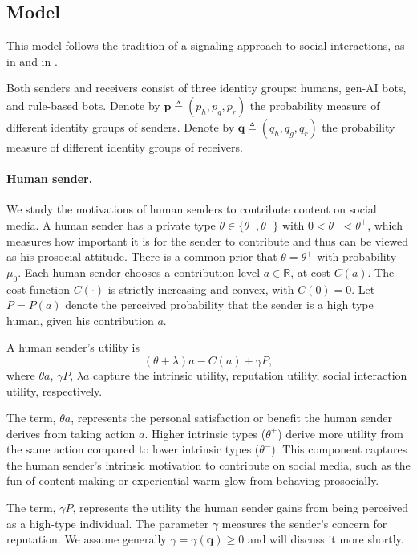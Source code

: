 \documentclass[english,12pt]{article}
\theoremstyle{plain}
\theoremstyle{plain}
\theoremstyle{definition}
\theoremstyle{definition}
\theoremstyle{assumption}
\theoremstyle{plain}
\theoremstyle{plain}
\theoremstyle{plain}
\theoremstyle{plain}
\theoremstyle{definition}%
\theoremstyle{plain}
\theoremstyle{plain}
\theoremstyle{plain}
\theoremstyle{plain}
\theoremstyle{plain}
\begin{document}
\subsection{Model}

This model follows the tradition of a signaling approach to social interactions, as in \cite{Bernheim:94} and in \cite{BenabouTirole:06}.

Both senders and receivers consist of three identity groups: humans, gen-AI bots, and rule-based bots. Denote by $\bm{p} \triangleq (p_h,p_g,p_r)$ the probability measure of different identity groups of senders. Denote by $\bm{q} \triangleq (q_h,q_g,q_r)$ the probability measure of different identity groups of receivers.

\paragraph{Human sender.} 

We study the motivations of human senders to contribute content on social media. A human sender has a private type $\theta\in \{\theta^-,\theta^+\}$ with $0<\theta^-<\theta^+$, which measures how important it is for the sender to contribute and thus can be viewed as his prosocial attitude. There is a common prior that $\theta=\theta^+$ with probability $\mu_0$. Each human sender chooses a contribution level $a\in \mathbb{R}$, at cost $C(a)$. The cost function $C(\cdot)$ is strictly increasing and convex, with $C(0)=0$. Let $P = P(a)$ denote the perceived probability that the sender is a high type human, given his contribution $a$.

A human sender's utility is
\begin{equation*}
    (\theta + \lambda )a - C(a) + \gamma P,
\end{equation*}
where $\theta a$, $\gamma P$, $\lambda a$ capture the intrinsic utility, reputation utility, social interaction utility, respectively.

The term, $\theta a$, represents the personal satisfaction or benefit the human sender derives from taking action $a$. Higher intrinsic types ($\theta^+$) derive more utility from the same action compared to lower intrinsic types ($\theta^-$). This component captures the human sender's intrinsic motivation to contribute on social media, such as the fun of content making or experiential warm glow from behaving prosocially.

The term, $\gamma P$, represents the utility the human sender gains from being perceived as a high-type individual. The parameter $\gamma$ measures the sender's concern for reputation. We assume generally $\gamma=\gamma(\bm{q})\geq 0$ and will discuss it more shortly.
\end{document}
